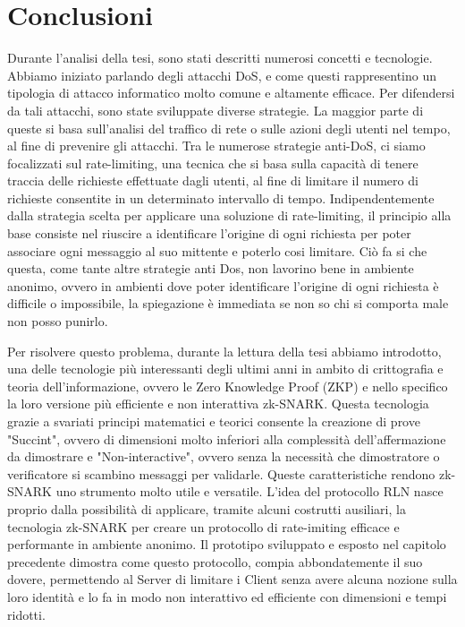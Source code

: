 \chapter*{Conclusioni}

Durante l'analisi della tesi, sono stati descritti numerosi concetti e tecnologie. Abbiamo iniziato parlando degli
attacchi DoS, e come questi rappresentino un tipologia di attacco informatico molto comune e altamente efficace. Per
difendersi da tali attacchi, sono state sviluppate diverse strategie. La maggior parte di queste si basa sull'analisi
del traffico di rete o sulle azioni degli utenti nel tempo, al fine di prevenire gli attacchi. Tra le numerose strategie
anti-DoS, ci siamo focalizzati sul rate-limiting, una tecnica che si basa sulla capacità di tenere traccia delle
richieste effettuate dagli utenti, al fine di limitare il numero di richieste consentite in un determinato intervallo di
tempo. Indipendentemente dalla strategia scelta per applicare una soluzione di rate-limiting, il principio alla base
consiste nel riuscire a identificare l'origine di ogni richiesta per poter associare ogni messaggio al suo mittente e
poterlo cosi limitare. Ciò fa si che questa, come tante altre strategie anti Dos, non lavorino bene in ambiente anonimo,
ovvero in ambienti dove poter identificare l'origine di ogni richiesta è difficile o impossibile, la spiegazione è
immediata se non so chi si comporta male non posso punirlo.

Per risolvere questo problema, durante la lettura della tesi abbiamo introdotto, una delle tecnologie più interessanti
degli ultimi anni in ambito di crittografia e teoria dell'informazione, ovvero le Zero Knowledge Proof (ZKP) e nello
specifico la loro versione più efficiente e non interattiva zk-SNARK. Questa tecnologia grazie a svariati principi
matematici e teorici consente la creazione di prove "Succint", ovvero di dimensioni molto inferiori alla complessità
dell'affermazione da dimostrare e "Non-interactive", ovvero senza la necessità che dimostratore o verificatore si
scambino messaggi per validarle. Queste caratteristiche rendono zk-SNARK uno strumento molto utile e versatile. L'idea
del protocollo RLN nasce proprio dalla possibilità di applicare, tramite alcuni costrutti ausiliari, la tecnologia
zk-SNARK per creare un protocollo di rate-imiting efficace e performante in ambiente anonimo. Il prototipo sviluppato e
esposto nel capitolo precedente dimostra come questo protocollo, compia abbondatemente il suo dovere, permettendo al
Server di limitare i Client senza avere alcuna nozione sulla loro identità e lo fa in modo non interattivo ed efficiente
con dimensioni e tempi ridotti.

